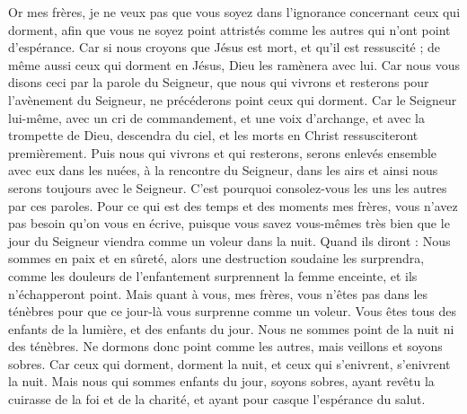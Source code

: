 \begin{multicols}{2}
Or mes frères, je ne veux pas que vous soyez dans l'ignorance concernant ceux qui dorment, afin que vous ne soyez point attristés comme les autres qui n'ont point d'espérance. 
Car si nous croyons que Jésus est mort, et qu'il est ressuscité ; de même aussi ceux qui dorment en Jésus, Dieu les ramènera avec lui.
Car nous vous disons ceci par la parole du Seigneur, que nous qui vivrons et resterons pour l'avènement du Seigneur, ne précéderons point ceux qui dorment.
Car le Seigneur lui-même, avec un cri de commandement, et une voix d'archange, et avec la trompette de Dieu, descendra du ciel, et les morts en Christ ressusciteront premièrement.
Puis nous qui vivrons et qui resterons, serons enlevés ensemble avec eux dans les nuées, à la rencontre du Seigneur, dans les airs et ainsi nous serons toujours avec le Seigneur. 
C'est pourquoi consolez-vous les uns les autres par ces paroles.
\VerseOne{}Pour ce qui est des temps et des moments mes frères, vous n'avez pas besoin qu'on vous en écrive,
puisque vous savez vous-mêmes très bien que le jour du Seigneur viendra comme un voleur dans la nuit.
Quand ils diront : Nous sommes en paix et en sûreté, alors une destruction soudaine les surprendra, comme les douleurs de l'enfantement surprennent la femme enceinte, et ils n'échapperont point.
Mais quant à vous, mes frères, vous n'êtes pas dans les ténèbres pour que ce jour-là vous surprenne comme un voleur.
Vous êtes tous des enfants de la lumière, et des enfants du jour. Nous ne sommes point de la nuit ni des ténèbres.
Ne dormons donc point comme les autres, mais veillons et soyons sobres.
Car ceux qui dorment, dorment la nuit, et ceux qui s'enivrent, s'enivrent la nuit.
Mais nous qui sommes enfants du jour, soyons sobres, ayant revêtu la cuirasse de la foi et de la charité, et ayant pour casque l'espérance du salut.

\end{multicols}
